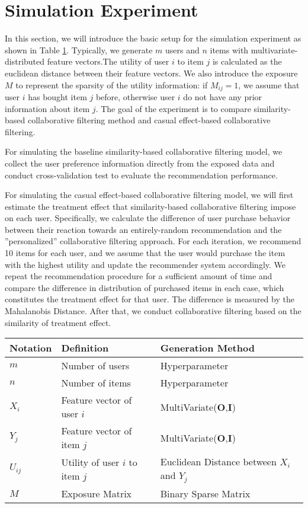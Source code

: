 \documentclass{NSF}
\begin{document}
\section{Simulation Experiment}
In this section, we will introduce the basic setup for the simulation experiment as shown in Table \ref{setup}. Typically, we generate $m$ users and $n$ items with multivariate-distributed feature vectors.The utility of user $i$ to item $j$ is calculated as the euclidean distance between their feature vectors. We also introduce the exposure $M$ to represent the sparsity of the utility information: if $M_{ij}=1$, we assume that user $i$ has bought item $j$ before, otherwise user $i$ do not have any prior information about item $j$. The goal of the experiment is to compare similarity-based collaborative filtering method and casual effect-based collaborative filtering.

For simulating the baseline similarity-based collaborative filtering model, we collect the user preference information directly from the exposed data and conduct cross-validation test to evaluate the recommendation performance.

For simulating the casual effect-based collaborative filtering model, we will first estimate the treatment effect that similarity-based collaborative filtering impose on each user. Specifically, we calculate the difference of user purchase behavior between their reaction towards an entirely-random recommendation and the ''personalized'' collaborative filtering approach. For each iteration, we recommend 10 items for each user, and we assume that the user would purchase the item with the highest utility and update the recommender system accordingly. We repeat the recommendation procedure for a sufficient amount of time and compare the difference in distribution of purchased items in each case, which constitutes the treatment effect for that user. The difference is measured by the Mahalanobis Distance. After that, we conduct collaborative filtering based on the similarity of treatment effect.

\begin{table}[h]
\centering
\begin{tabular}{l l l}
\hline
Notation & Definition & Generation Method \\ \hline
$m$ & Number of users & Hyperparameter \\
$n$ & Number of items & Hyperparameter \\
$X_{i}$ & Feature vector of user $i$ & MultiVariate(\textbf{O},\textbf{I})\\
$Y_{j}$ & Feature vector of item $j$ & MultiVariate(\textbf{O},\textbf{I})\\
$U_{ij}$ & Utility of user $i$ to item $j$ & Euclidean Distance between $X_{i}$ and $Y_{j}$\\
$M$ & Exposure Matrix & Binary Sparse Matrix \\ \hline
\end{tabular}
\label{setup}
\end{table}


\renewcommand\refname{References Cited}


\end{document}
